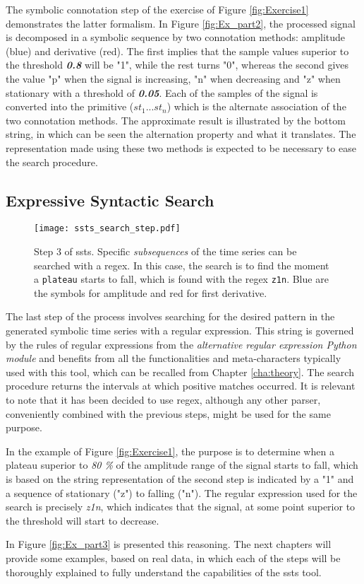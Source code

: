 The symbolic connotation step of the exercise of Figure \ref{fig:Exercise1} demonstrates the latter formalism. In Figure \ref{fig:Ex_part2}, the processed signal is decomposed in a symbolic sequence by two connotation methods: amplitude (blue) and derivative (red). The first implies that the sample values superior to the threshold \textit{\textbf{0.8}} will be "1", while the rest turns "0", whereas the second gives the value "p" when the signal is increasing, "n" when decreasing and "z" when stationary with a threshold of \textit{\textbf{0.05}}. Each of the samples of the signal is converted into the primitive ($st_1...st_n$) which is the alternate association of the two connotation methods. The approximate result is illustrated by the bottom string, in which can be seen the alternation property and what it translates. The representation made using these two methods is expected to be necessary to ease the search procedure.

\subsection{Expressive Syntactic Search}

\begin{figure}
\centering
\texttt{[image: ssts\_search\_step.pdf]}
\label{fig:ssts_search}
\caption{Step 3 of \gls{ssts}. Specific \textit{subsequences} of the time series can be searched with a \gls{regex}. In this case, the search is to find the moment a \texttt{plateau} starts to fall, which is found with the \gls{regex} \texttt{z1n}. Blue are the symbols for amplitude and red for first derivative.}
\end{figure}

The last step of the process involves searching for the desired pattern in the generated symbolic time series with a regular expression. This string is governed by the rules of regular expressions from the \textit{alternative regular expression Python module} \cite{rgxPy} and benefits from all the functionalities and meta-characters typically used with this tool, which can be recalled from Chapter \ref{cha:theory}. The search procedure returns the intervals at which positive matches occurred. It is relevant to note that it has been decided to use \gls{regex}, although any other parser, conveniently combined with the previous steps, might be used for the same purpose.
\par
In the example of Figure \ref{fig:Exercise1}, the purpose is to determine when a plateau superior to \textit{80 \%} of the amplitude range of the signal starts to fall, which is based on the string representation of the second step is indicated by a "1" and a sequence of stationary ("z") to falling ("n"). The regular expression used for the search is precisely \textit{z1n}, which indicates that the signal, at some point superior to the threshold will start to decrease. 
\par
In Figure \ref{fig:Ex_part3} is presented this reasoning.
The next chapters will provide some examples, based on real data, in which each of the steps will be thoroughly explained to fully understand the capabilities of the \gls{ssts} tool.


